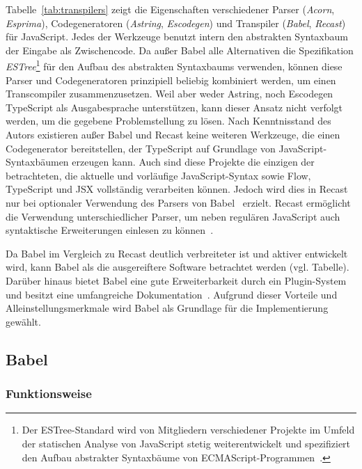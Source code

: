 Tabelle~\ref{tab:transpilers} zeigt die Eigenschaften verschiedener Parser (\textit{Acorn}, \textit{Esprima}), Codegeneratoren (\textit{Astring}, \textit{Escodegen}) und Transpiler (\textit{Babel}, \textit{Recast}) für JavaScript. Jedes der Werkzeuge benutzt intern den abstrakten Syntaxbaum der Eingabe als Zwischencode. Da außer Babel alle Alternativen die Spezifikation \textit{ESTree}\footnote{Der ESTree-Standard wird von Mitgliedern verschiedener Projekte im Umfeld der statischen Analyse von JavaScript stetig weiterentwickelt und spezifiziert den Aufbau abstrakter Syntaxbäume von ECMAScript-Programmen~\autocite{ESTREE_SPEC}.} für den Aufbau des abstrakten Syntaxbaums verwenden, können diese Parser und Codegeneratoren prinzipiell beliebig kombiniert werden, um einen Transcompiler zusammenzusetzen. Weil aber weder Astring, noch Escodegen TypeScript als Ausgabesprache unterstützen, kann dieser Ansatz nicht verfolgt werden, um die gegebene Problemstellung zu lösen. Nach Kenntnisstand des Autors existieren außer Babel und Recast keine weiteren Werkzeuge, die einen Codegenerator bereitstellen, der TypeScript auf Grundlage von JavaScript-Syntaxbäumen erzeugen kann. Auch sind diese Projekte die einzigen der betrachteten, die aktuelle und vorläufige JavaScript-Syntax sowie Flow, TypeScript und JSX vollständig verarbeiten können. Jedoch wird dies in Recast nur bei optionaler Verwendung des Parsers von Babel~\autocite{BABEL:PARSER} erzielt. Recast ermöglicht die Verwendung unterschiedlicher Parser, um neben regulären JavaScript auch syntaktische Erweiterungen einlesen zu können~\autocite{RECAST}.

Da Babel im Vergleich zu Recast deutlich verbreiteter ist und aktiver entwickelt wird, kann Babel als die ausgereiftere Software betrachtet werden (vgl. Tabelle). Darüber hinaus bietet Babel eine gute Erweiterbarkeit durch ein Plugin-System~\autocite{BABEL:HANDBOOK} und besitzt eine umfangreiche Dokumentation~\autocite{BABEL:DOCS}. Aufgrund dieser Vorteile und Alleinstellungsmerkmale wird Babel als Grundlage für die Implementierung gewählt.

\subsection{Babel}
\label{sec:babel}

\subsubsection{Funktionsweise}

